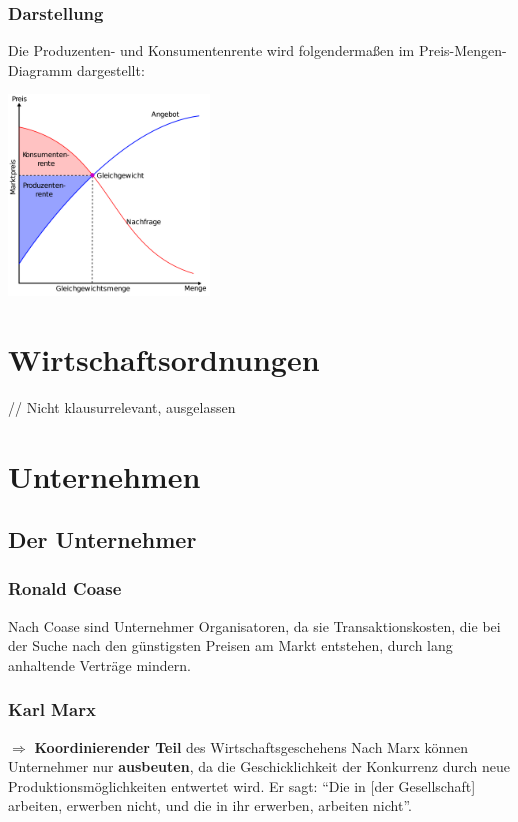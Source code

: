 \documentclass[titlepage,parskip=half]{scrartcl}
\let\Section\section
\renewcommand\section{\clearpage\Section}
\begin{document}
\subsubsection{Darstellung}
Die Produzenten- und Konsumentenrente wird folgendermaßen im Preis-Mengen-Diagramm dargestellt:

\begin{center}
\includegraphics[width=0.4\textwidth]{bilder/wohlfahrt.png}
\end{center}

\section{Wirtschaftsordnungen}
// Nicht klausurrelevant, ausgelassen

\section{Unternehmen}
\subsection{Der Unternehmer}
\subsubsection{Ronald Coase}
Nach Coase sind Unternehmer Organisatoren, da sie Transaktionskosten, die bei der Suche nach den günstigsten Preisen am Markt entstehen, durch lang anhaltende Verträge mindern.

\subsubsection{Karl Marx}
$\Rightarrow$ \textbf{Koordinierender Teil} des Wirtschaftsgeschehens
Nach Marx können Unternehmer nur \textbf{ausbeuten}, da die Geschicklichkeit der Konkurrenz durch neue Produktionsmöglichkeiten entwertet wird. Er sagt: \enquote{Die in [der Gesellschaft] arbeiten, erwerben nicht, und die in ihr erwerben, arbeiten nicht}.
\end{document}
